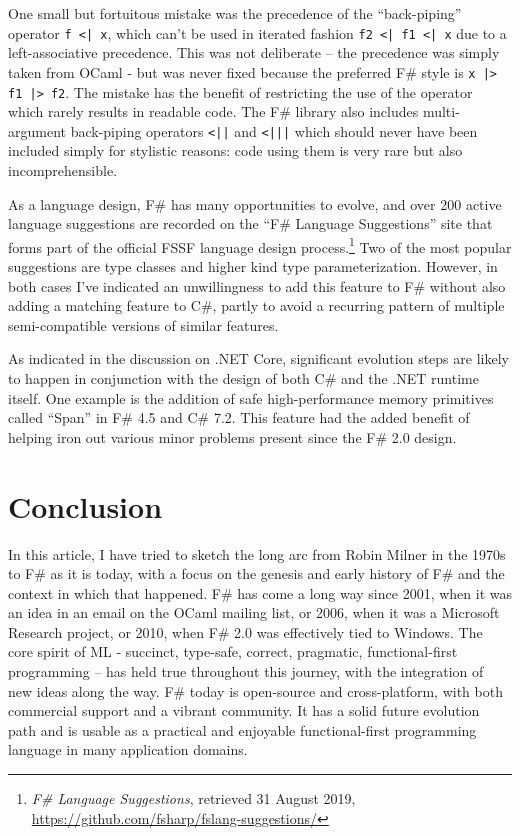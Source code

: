 \documentclass[acmsmall]{acmart}\settopmatter{}
\begin{document}
One small but fortuitous mistake was the precedence of the “back-piping”
operator \verb$f <| x$, which can’t be used in iterated fashion \verb$f2 <| f1 <| x$ due to
a left-associative precedence. This was not deliberate – the precedence was simply
taken from OCaml - but was never fixed because the preferred F\# style is  \verb$x |> f1 |> f2$. The
mistake has the benefit of restricting the use of the operator which rarely results in readable code. The F\# library also includes
multi-argument back-piping operators \verb$<||$ and \verb$<|||$ which should never have been included simply for
stylistic reasons: code using them is very rare but also incomprehensible.

As a language design, F\# has many opportunities to evolve, and over 200 active language
suggestions are recorded on the “F\# Language Suggestions” site that forms part of the
official FSSF language design process.\footnote{\textit{F\# Language Suggestions}, retrieved 31 August 2019, \url{https://github.com/fsharp/fslang-suggestions/}}
Two of the most popular suggestions are type classes
and higher kind type parameterization. However, in both cases I’ve indicated an unwillingness
to add this feature to F\# without also adding a matching feature to C\#, partly to avoid a
recurring pattern of multiple semi-compatible versions of similar features.

As indicated in the discussion on .NET Core, significant evolution steps are likely to happen in
conjunction with the design of both C\# and the .NET runtime itself.  One example is the addition
of safe high-performance memory primitives called “Span” in F\# 4.5 and C\# 7.2.  This feature
had the added benefit of helping iron out various minor problems present since the F\# 2.0 design.

\section*{Conclusion}

In this article, I have tried to sketch the long arc from Robin Milner in the 1970s to F\# as it
is today, with a focus on the genesis and early history of F\# and the context in which
that happened. F\# has come a long way since 2001, when it was an idea in
an email on the OCaml mailing list, or 2006, when it was a Microsoft Research project,
or 2010, when F\# 2.0 was effectively tied to Windows. The core spirit of ML - succinct,
type-safe, correct, pragmatic, functional-first programming – has held true throughout
this journey, with the integration of new ideas along the way.  F\# today is open-source
and cross-platform, with both commercial support and a vibrant community. It has a solid future
evolution path and is usable as a practical and enjoyable functional-first programming language in many application domains.  
\end{document}

